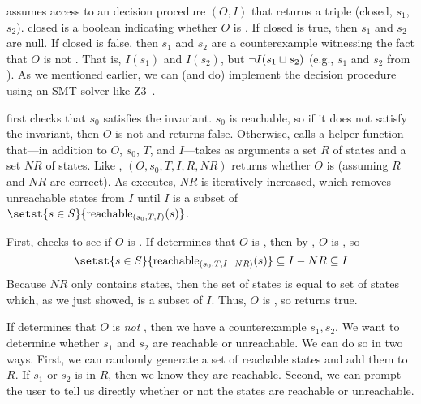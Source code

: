 {}

\IsInvConfluent{} assumes access to an \invariantclosure{} decision procedure
\IsIclosed$(O, I)$ that returns a triple (closed, $s_1$, $s_2$). closed is a
boolean indicating whether $O$ is \Iclosed{}. If closed is true, then $s_1$ and
$s_2$ are null. If closed is false, then $s_1$ and $s_2$ are a counterexample
witnessing the fact that $O$ is not \Iclosed{}. That is, $I(s_1)$ and $I(s_2)$,
but $\lnot I(s_1 \sqcup s_2)$ (e.g., $s_1$ and $s_2$ from ).  As
we mentioned earlier, we can (and do) implement the \invariantclosure{}
decision procedure using an SMT solver like Z3~\cite{de2008z3}.

\IsInvConfluent{} first checks that $s_0$ satisfies the invariant. $s_0$ is
reachable, so if it does not satisfy the invariant, then $O$ is not
\sTIconfluent{} and \IsInvConfluent{} returns false. Otherwise,
\IsInvConfluent{} calls a helper function \Helper{} that---in addition to $O$,
$s_0$, $T$, and $I$---takes as arguments a set $R$ of \sTIreachable{} states
and a set $NR$ of \sTIunreachable{} states. Like \IsInvConfluent, \Helper$(O,
s_0, T, I, R, NR)$ returns whether $O$ is \sTIconfluent{} (assuming $R$ and
$NR$ are correct).  As  executes, $NR$ is
iteratively increased, which removes unreachable states from $I$ until $I$ is a
subset of $\setst{s \in S}{\sTIreachablepredicate{s}}$.

First, \Helper{} checks to see if $O$ is .
%
If \IsIclosed{} determines that $O$ is , then by
, $O$ is , so
\[
  \setst{s \in S}{\stireachablepredicate{s_0}{T}{I-NR}{s}}
    \subseteq I - NR
    \subseteq I
\]
Because $NR$ only contains \sTIunreachable{} states, then the set of
\sTIreachable{} states is equal to set of  states
which, as we just showed, is a subset of $I$.  Thus, $O$ is \sTIconfluent{}, so
\Helper{} returns true.

If \IsIclosed{} determines that $O$ is \emph{not} , then we
have a counterexample $s_1, s_2$. We want to determine whether $s_1$ and $s_2$
are reachable or unreachable. We can do so in two ways.
%
First, we can randomly generate a set of reachable states and add them to $R$.
If $s_1$ or $s_2$ is in $R$, then we know they are reachable.
%
Second, we can prompt the user to tell us directly whether or not the states
are reachable or unreachable.

